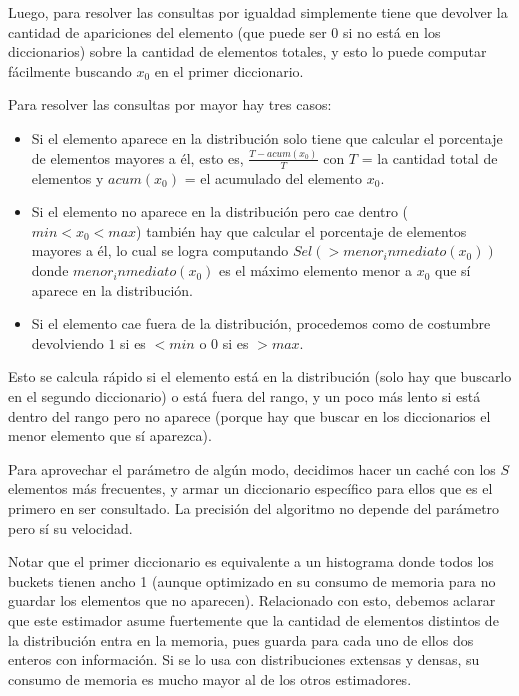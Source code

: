 Luego, para resolver las consultas por igualdad simplemente tiene que devolver la cantidad de apariciones del elemento (que puede ser 0 si no está en los diccionarios) sobre la cantidad de elementos totales, y esto lo puede computar fácilmente buscando $x_0$ en el primer diccionario.

Para resolver las consultas por mayor hay tres casos:
\begin{itemize}
 \item Si el elemento aparece en la distribución solo tiene que calcular el porcentaje de elementos mayores a él, esto es, $\frac{T-acum(x_0)}{T}$ con $T$ = la cantidad total de elementos y $acum(x_0)$ = el acumulado del elemento $x_0$.
 \item Si el elemento no aparece en la distribución pero cae dentro ($min < x_0 < max$) también hay que calcular el porcentaje de elementos mayores a él, lo cual se logra computando $Sel(>menor_inmediato(x_0))$ donde $menor_inmediato(x_0)$ es el máximo elemento menor a $x_0$ que sí aparece en la distribución.
 \item Si el elemento cae fuera de la distribución, procedemos como de costumbre devolviendo $1$ si es $<min$ o $0$ si es $>max$.
\end{itemize}
Esto se calcula rápido si el elemento está en la distribución (solo hay que buscarlo en el segundo diccionario) o está fuera del rango, y un poco más lento si está dentro del rango pero no aparece (porque hay que buscar en los diccionarios el menor elemento que sí aparezca).

Para aprovechar el parámetro de algún modo, decidimos hacer un caché con los $S$ elementos más frecuentes, y armar un diccionario específico para ellos que es el primero en ser consultado. La precisión del algoritmo no depende del parámetro pero sí su velocidad.

Notar que el primer diccionario es equivalente a un histograma donde todos los buckets tienen ancho 1 (aunque optimizado en su consumo de memoria para no guardar los elementos que no aparecen). Relacionado con esto, debemos aclarar que este estimador asume fuertemente que la cantidad de elementos distintos de la distribución entra en la memoria, pues guarda para cada uno de ellos dos enteros con información. Si se lo usa con distribuciones extensas y densas, su consumo de memoria es mucho mayor al de los otros estimadores.